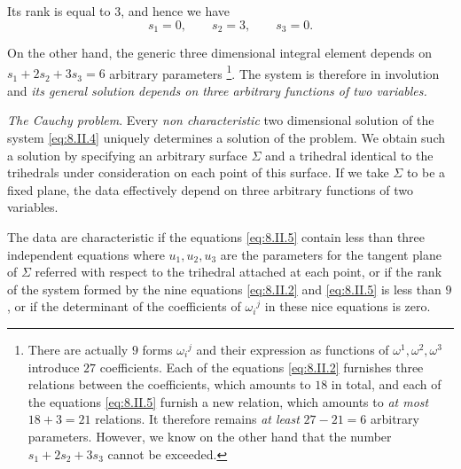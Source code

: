 \documentclass[leqno,11pt]{book}
\numberwithin{equation}{chapter}
\theoremstyle{shape1}
\theoremstyle{shape0}
\theoremstyle{shape2}
\theoremstyle{definition}
\begin{document}
Its rank is equal to $3$, and hence we have
\[
s_{1}=0,\qquad s_{2}=3,\qquad s_{3}=0.
\]

On the other hand, the generic three dimensional integral element depends  on $s_{1}+2s_{2}+3s_{3}=6$ arbitrary parameters \footnote{There are actually $9$ forms $\omega_{i}{}^{j}$ and their expression as functions of $\omega^{1},\omega^{2},\omega^{3}$ introduce $27$ coefficients. Each of the equations \eqref{eq:8.II.2} furnishes three relations between the coefficients, which amounts to $18$ in total, and each of the equations \eqref{eq:8.II.5} furnish a new relation, which amounts to \emph{at most} $18+3=21$ relations. It therefore remains \emph{at least} $27-21=6$ arbitrary parameters. However, we know on the other hand that the number $s_{1}+2s_{2}+3s_{3}$ cannot be exceeded.}. The system is therefore in involution and  \emph{its general solution depends on three arbitrary functions of two variables.}

\vspace{12pt}\fsec\emph{The Cauchy problem}. Every \emph{non characteristic} two dimensional solution of the system \eqref{eq:8.II.4} uniquely determines a solution of the problem. We obtain such a solution by specifying an arbitrary surface $\Sigma$ and a trihedral identical to the trihedrals under consideration on each point of this surface. If we take $\Sigma$ to be a fixed plane, the data effectively depend on three arbitrary functions of two variables.

The data are characteristic if the equations \eqref{eq:8.II.5} contain less than three independent equations where $u_{1},u_{2},u_{3}$ are the parameters for the tangent plane of $\Sigma$ referred with respect to the trihedral attached at each point, or if the rank of the system formed by the nine equations \eqref{eq:8.II.2} and \eqref{eq:8.II.5} is less than $9$, or if the determinant of the coefficients of $\omega_{i}{}^{j}$ in these nice equations is zero.
\end{document}
